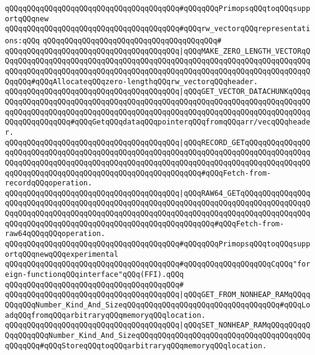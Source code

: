 \newline
\verb|qQQqqQQqqQQqqQQqqQQqqQQqqQQqqQQqqQQqqQQq#qQQqqQQqPrimopsqQQqtoqQQqsupportqQQqnew|\newline
\verb|qQQqqQQqqQQqqQQqqQQqqQQqqQQqqQQqqQQqqQQq#qQQqrw_vectorqQQqrepresentations:qQQq|\newline
\verb|qQQqqQQqqQQqqQQqqQQqqQQqqQQqqQQqqQQqqQQq#|\newline
\verb|qQQqqQQqqQQqqQQqqQQqqQQqqQQqqQQqqQQqqQQq|\verb#|qQQqMAKE_ZERO_LENGTH_VECTORqQQqqQQqqQQqqQQqqQQqqQQqqQQqqQQqqQQqqQQqqQQqqQQqqQQqqQQqqQQqqQQqqQQqqQQqqQQqqQQqqQQqqQQqqQQqqQQqqQQqqQQqqQQqqQQqqQQqqQQqqQQqqQQqqQQqqQQqqQQqqQQqqQQq#\verb|#qQQqAllocateqQQqzero-lengthqQQqrw_vectorqQQqheader.|\newline
\verb|qQQqqQQqqQQqqQQqqQQqqQQqqQQqqQQqqQQqqQQq|\verb#|qQQqGET_VECTOR_DATACHUNKqQQqqQQqqQQqqQQqqQQqqQQqqQQqqQQqqQQqqQQqqQQqqQQqqQQqqQQqqQQqqQQqqQQqqQQqqQQqqQQqqQQqqQQqqQQqqQQqqQQqqQQqqQQqqQQqqQQqqQQqqQQqqQQqqQQqqQQqqQQqqQQqqQQqqQQqqQQqqQQq#\verb|#qQQqGetqQQqdataqQQqpointerqQQqfromqQQqarr/vecqQQqheader.|\newline
\verb|qQQqqQQqqQQqqQQqqQQqqQQqqQQqqQQqqQQqqQQq|\verb#|qQQqRECORD_GETqQQqqQQqqQQqqQQqqQQqqQQqqQQqqQQqqQQqqQQqqQQqqQQqqQQqqQQqqQQqqQQqqQQqqQQqqQQqqQQqqQQqqQQqqQQqqQQqqQQqqQQqqQQqqQQqqQQqqQQqqQQqqQQqqQQqqQQqqQQqqQQqqQQqqQQqqQQqqQQqqQQqqQQqqQQqqQQqqQQqqQQqqQQqqQQqqQQqqQQq#\verb|#qQQqFetch-from-recordqQQqoperation.|\newline
\verb|qQQqqQQqqQQqqQQqqQQqqQQqqQQqqQQqqQQqqQQq|\verb#|qQQqRAW64_GETqQQqqQQqqQQqqQQqqQQqqQQqqQQqqQQqqQQqqQQqqQQqqQQqqQQqqQQqqQQqqQQqqQQqqQQqqQQqqQQqqQQqqQQqqQQqqQQqqQQqqQQqqQQqqQQqqQQqqQQqqQQqqQQqqQQqqQQqqQQqqQQqqQQqqQQqqQQqqQQqqQQqqQQqqQQqqQQqqQQqqQQqqQQqqQQqqQQqqQQqqQQq#\verb|#qQQqFetch-from-raw64qQQqqQQqoperation.|\newline
\newline
\verb|qQQqqQQqqQQqqQQqqQQqqQQqqQQqqQQqqQQqqQQq#qQQqqQQqPrimopsqQQqtoqQQqsupportqQQqnewqQQqexperimental|\newline
\verb|qQQqqQQqqQQqqQQqqQQqqQQqqQQqqQQqqQQqqQQq#qQQqqQQqqQQqqQQqqQQqCqQQq"foreign-functionqQQqinterface"qQQq(FFI).qQQq|\newline
\verb|qQQqqQQqqQQqqQQqqQQqqQQqqQQqqQQqqQQqqQQq#|\newline
\verb|qQQqqQQqqQQqqQQqqQQqqQQqqQQqqQQqqQQqqQQq|\verb#|qQQqGET_FROM_NONHEAP_RAMqQQqqQQqqQQqNumber_Kind_And_SizeqQQqqQQqqQQqqQQqqQQqqQQqqQQqqQQqqQQq#\verb|#qQQqLoadqQQqfromqQQqarbitraryqQQqmemoryqQQqlocation.|\newline
\verb|qQQqqQQqqQQqqQQqqQQqqQQqqQQqqQQqqQQqqQQq|\verb#|qQQqSET_NONHEAP_RAMqQQqqQQqqQQqqQQqqQQqNumber_Kind_And_SizeqQQqqQQqqQQqqQQqqQQqqQQqqQQqqQQqqQQqqQQqqQQqqQQq#\verb|#qQQqStoreqQQqtoqQQqarbitraryqQQqmemoryqQQqlocation.|\newline
